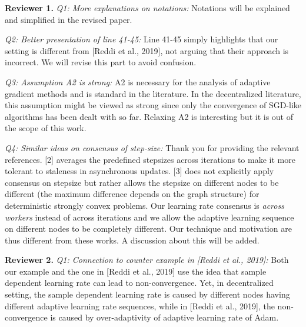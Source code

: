 \documentclass{article}
\begin{document}
\textbf{Reviewer 1.}
\textit{Q1: More explanations on notations:} 
Notations will be explained and simplified in the revised paper.\vspace{-5pt}

\textit{Q2: Better presentation of line 41-45:} Line 41-45 simply highlights that our setting is different from  [Reddi et al., 2019], not arguing that their approach is incorrect. We will revise this part to avoid confusion.\vspace{-5pt}

\textit{Q3: Assumption A2 is strong:}
A2 is necessary for the analysis of adaptive gradient methods and is standard in the literature.
In the decentralized literature, this assumption might be viewed as strong since only the convergence of SGD-like algorithms has been dealt with so far.
Relaxing A2 is interesting but it is out of the scope of this work. \vspace{-5pt}

\textit{Q4: Similar ideas on consensus of step-size:}
Thank you for providing the relevant references. 
[2] averages the predefined stepsizes across iterations to make it more tolerant to staleness in asynchronous updates.  
[3] does not explicitly apply consensus on stepsize but rather allows the stepsize on different nodes to be different (the maximum difference depends on the graph structure) for deterministic strongly convex problems. 
Our learning rate consensus is \emph{across workers} instead of across iterations and we allow the adaptive learning sequence on different nodes to be completely different. 
Our technique and motivation are thus different from these works. 
A discussion about this will be added.\vspace{-5pt}


\textbf{Reviewer 2.}
\textit{Q1: Connection to counter example in [Reddi et al., 2019]:}
Both our example and the one in [Reddi et al., 2019] use the idea that sample dependent learning rate can lead to non-convergence. 
Yet, in decentralized setting, the sample dependent learning rate is caused by different nodes having different adaptive learning rate sequences, while in [Reddi et al., 2019], the non-convergence is caused by over-adaptivity of adaptive learning rate of Adam. \vspace{-5pt}
\end{document}
